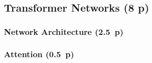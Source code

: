   
  
  
  
  


\subsection{Transformer Networks (8 p)}\label{sec:transformer-networks}

\subsubsection{Network Architecture (2.5~p)}\label{sec:network-architecture}

\subsubsection{Attention (0.5~p)}\label{sec:attention}


